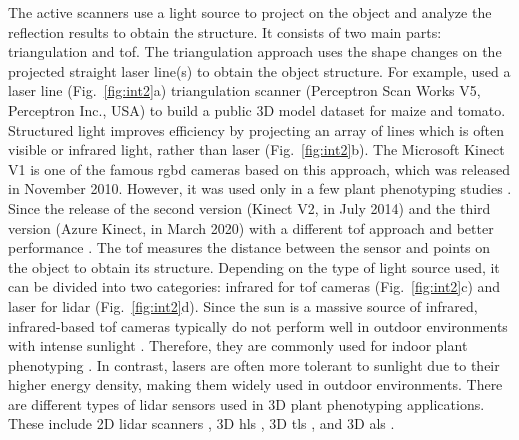 

The active scanners use a light source to project on the object and analyze the reflection results to obtain the structure. It consists of two main parts: triangulation and \gls{tof}. The triangulation approach uses the shape changes on the projected straight laser line(s) to obtain the object structure. For example, \citet[Figure~3]{schunck_pheno4d_2021} used a laser line (Fig.~\ref{fig:int2}a) triangulation scanner (Perceptron Scan Works V5, Perceptron Inc., USA) to build a public 3D model dataset for maize and tomato. Structured light improves efficiency by projecting an array of lines which is often visible or infrared light, rather than laser (Fig.~\ref{fig:int2}b). The Microsoft Kinect V1 is one of the famous \gls{rgbd} cameras based on this approach, which was released in November 2010. However, it was used only in a few plant phenotyping studies \citep{nguyen_structured_2015}. Since the release of the second version (Kinect V2, in July 2014) and the third version (Azure Kinect, in March 2020) with a different \gls{tof} approach and better performance \citep{tolgyessy_evaluation_2021, lachat_assessment_2015}. 
The \gls{tof} measures the distance between the sensor and points on the object to obtain its structure. Depending on the type of light source used, it can be divided into two categories: infrared for \gls{tof} cameras (Fig.~\ref{fig:int2}c) and laser for \gls{lidar} (Fig.~\ref{fig:int2}d). Since the sun is a massive source of infrared, infrared-based \gls{tof} cameras typically do not perform well in outdoor environments with intense sunlight \citep{tolgyessy_evaluation_2021}. Therefore, they are commonly used for indoor plant phenotyping \citep{martinez_low_2019, zhang_3d_2020, xu_global_2023}. In contrast, lasers are often more tolerant to sunlight due to their higher energy density, making them widely used in outdoor environments. There are different types of \gls{lidar} sensors used in 3D plant phenotyping applications. These include 2D \gls{lidar} scanners \citep{garrido_3d_2015}, 3D \gls{hls} \citep{ma_calculation_2019}, 3D \gls{tls} \citep{wu_accurate_2019, su_estimation_2018, qiu_field-based_2019}, and 3D \gls{als} \citep{ten_biomass_2019, nguyen_uav_2023}.

